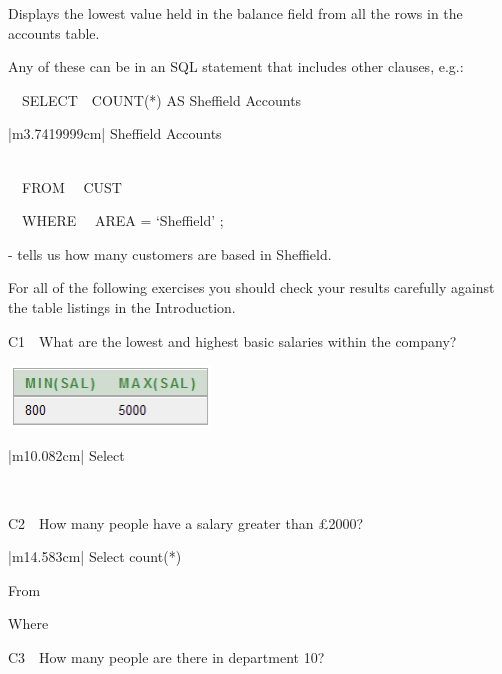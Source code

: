 Displays the lowest value held in the balance field from all the rows in the accounts table.

Any of these can be in an SQL statement that includes other clauses, e.g.:

\ \ SELECT\ \ COUNT(*)  AS {\textquotedbl}Sheffield Accounts{\textquotedbl}

\begin{center}
\begin{minipage}{3.942cm}
\begin{flushleft}
\tablefirsthead{}
\tablehead{}
\tabletail{}
\tablelasttail{}
\begin{supertabular}{|m{3.7419999cm}|}
\hline
Sheffield Accounts\\\\
\end{supertabular}
\end{flushleft}
\end{minipage}
\end{center}
\ \ FROM \ \ CUST

\ \ WHERE \ \ AREA = {}`Sheffield' ;

{}- tells us how many customers are based in Sheffield.

For all of the following exercises you should check your results carefully against the table listings in the Introduction.

C1\ \ What are the lowest and highest basic salaries within the company?



\begin{center}
  
\includegraphics[width=5.415cm,height=1.658cm]{images/img (31).png}

\end{center}
\begin{flushleft}
\tablefirsthead{}
\tablehead{}
\tabletail{}
\tablelasttail{}
\begin{supertabular}{|m{10.082cm}|}
\hline
Select

\\\hline
\end{supertabular}
\end{flushleft}
C2\ \ How many people have a salary greater than £2000?

\begin{flushleft}
\tablefirsthead{}
\tablehead{}
\tabletail{}
\tablelasttail{}
\begin{supertabular}{|m{14.583cm}|}
\hline
Select count(*)

From

Where\\\hline
\end{supertabular}
\end{flushleft}
C3\ \ How many people are there in department 10?  

